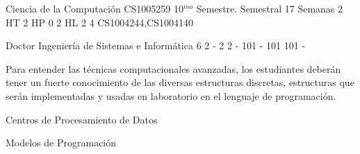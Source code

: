 \documentclass[a4paper,8pt]{article}
\begin{document}
\setNombreProfesor{}
\setGradoProfesorAbreviado{}
\sylabusHeader

\academicaTable
{Ciencia de la Computación} %
{CS1005259} %
{10$^{mo}$ Semestre.} %
{Semestral} %
{17 Semanas} %
{2 HT} %
{2 HP} %
{0} %
{2 HL}  %
{2} %
{4} %
{CS1004244,CS1004140} %

\administrativaTable
{Doctor} %
{Ingeniería de Sistemas e Informática} %
{6} %
{2} %
{-} %
{2} %
{2} %
{-} %
{101} %
{-} %
{101} %
{101} %
{-} %


\begin{fundamentacion}
Para entender las técnicas computacionales avanzadas, los estudiantes deberán tener un fuerte conocimiento de las
diversas estructuras discretas, estructuras que serán implementadas y usadas en laboratorio en el lenguaje de programación.

\end{fundamentacion}

\begin{sumilla}
\item \PDDistributedSystems
\item \PDCloudComputing
\item Centros de Procesamiento de Datos
\item \PDCloudComputing
\item \PDCloudComputing
\item Modelos de Programación

\end{sumilla}

\begin{competenciasAsignatura}
\item {}
\item {}
\item {}
\item {}
\item {}
\item {}

\end{competenciasAsignatura}
\end{document}
